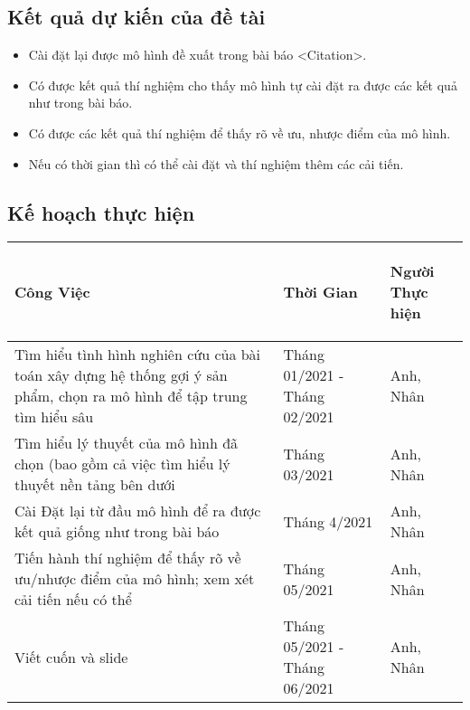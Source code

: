 \documentclass{article}[14pt]
\begin{document}
{    
    \subsection{Kết quả dự kiến của đề tài}
        
    \begin{itemize}
        \item Cài đặt lại được mô hình đề xuất trong bài báo <Citation>.
        \item Có được kết quả thí nghiệm cho thấy mô hình tự cài đặt ra được các kết quả như trong bài báo.
        \item Có được các kết quả thí nghiệm để thấy rõ về ưu, nhược điểm của mô hình.
        \item Nếu có thời gian thì có thể cài đặt và thí nghiệm thêm các cải tiến.
    \end{itemize}
    
    \subsection{Kế hoạch thực hiện}

\begin{tabular}{ | m{20em} | m{4cm}| m{4cm} | } 

  \hline
   \centering\textbf { Công Việc} &  \centering\textbf{Thời Gian}  & \begin{center}
        \textbf{Người Thực hiện}   \end{center} \\ 
  \hline
  Tìm hiểu tình hình nghiên cứu của bài toán xây dựng hệ thống gợi ý sản phẩm, chọn ra mô hình để tập trung tìm hiểu sâu & Tháng 01/2021 - Tháng 02/2021 & Anh, Nhân \\ 
  \hline
  Tìm hiểu lý thuyết của mô hình đã chọn (bao gồm cả việc tìm hiểu lý thuyết nền tảng bên dưới &  Tháng 03/2021 & Anh, Nhân \\ 
  \hline
  Cài Đặt lại từ đầu mô hình để ra được kết quả giống như trong bài báo &  Tháng 4/2021 & Anh, Nhân \\
  \hline
  Tiến hành thí nghiệm để thấy rõ về ưu/nhược điểm của mô hình; xem xét cải tiến nếu có thể &  Tháng 05/2021 & Anh, Nhân \\
  \hline
 Viết cuốn và slide &  Tháng 05/2021 - Tháng 06/2021 & Anh, Nhân \\
 \hline
\end{tabular}


   
       
    
    }
    
    
    \nocite{*}
\end{document}
